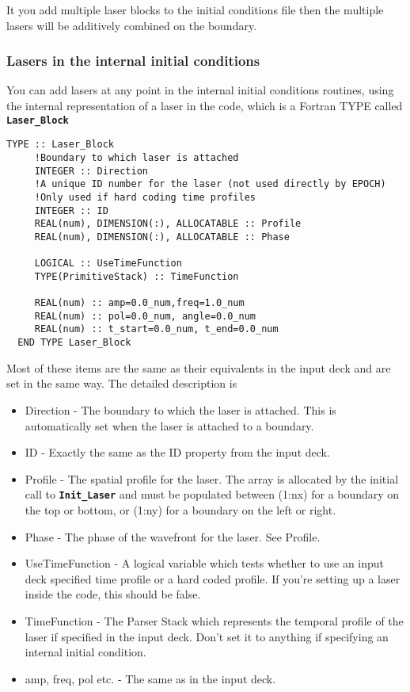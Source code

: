 \documentclass[12pt]{article}
\newcommand{\simpleboxverbatim}{\begin{Verbatim}[obeytabs=true,frame=single,
  framerule=0.5mm,rulecolor=\color{warwickmid}]}
\newcommand{\inlinecode}[1]{{\color{warwickred} \bf\texttt{#1}}}
\begin{document}
It you add multiple laser blocks to the initial conditions file then the
multiple lasers will be additively combined on the boundary.

\subsubsection{Lasers in the internal initial conditions}
You can add lasers at any point in the internal initial conditions routines,
using the internal representation of a laser in the code, which is a Fortran
TYPE called \inlinecode{Laser\_Block}
\simpleboxverbatim
  TYPE :: Laser_Block
     !Boundary to which laser is attached
     INTEGER :: Direction
     !A unique ID number for the laser (not used directly by EPOCH)
     !Only used if hard coding time profiles
     INTEGER :: ID
     REAL(num), DIMENSION(:), ALLOCATABLE :: Profile
     REAL(num), DIMENSION(:), ALLOCATABLE :: Phase

     LOGICAL :: UseTimeFunction
     TYPE(PrimitiveStack) :: TimeFunction

     REAL(num) :: amp=0.0_num,freq=1.0_num
     REAL(num) :: pol=0.0_num, angle=0.0_num
     REAL(num) :: t_start=0.0_num, t_end=0.0_num
  END TYPE Laser_Block
\end{Verbatim}
Most of these items are the same as their equivalents in the input deck and
are set in the same way. The detailed description is
\begin{itemize}
\item Direction - The boundary to which the laser is attached. This is
  automatically set when the laser is attached to a boundary.
\item ID - Exactly the same as the ID property from the input deck.
\item Profile - The spatial profile for the laser. The array is allocated by
  the initial call to \inlinecode{Init\_Laser} and must be populated between
  (1:nx) for a boundary on the top or bottom, or (1:ny) for a boundary on the
  left or right.
\item Phase - The phase of the wavefront for the laser. See Profile.
\item UseTimeFunction - A logical variable which tests whether to use an input
  deck specified time profile or a hard coded profile. If you're setting up a
  laser inside the code, this should be false.
\item TimeFunction - The Parser Stack which represents the temporal profile of
  the laser if specified in the input deck. Don't set it to anything if
  specifying an internal initial condition.
\item amp, freq, pol etc. - The same as in the input deck.
\end{itemize}
\end{document}
